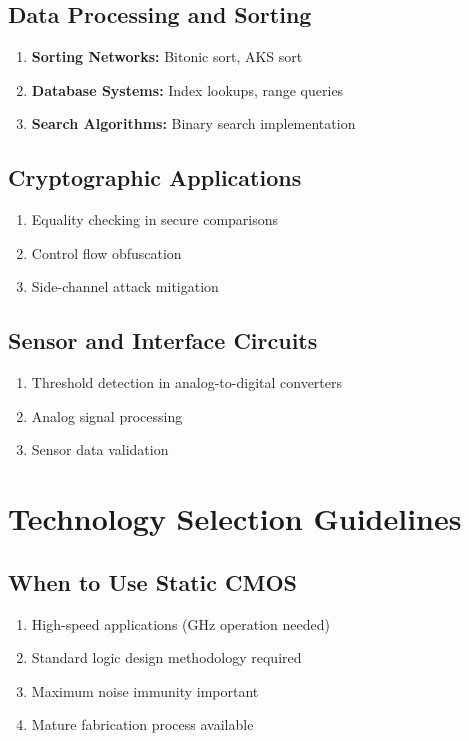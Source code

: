\documentclass[12pt,a4paper,twoside]{report}
\begin{document}
\subsection{Data Processing and Sorting}

\begin{enumerate}
    \item \textbf{Sorting Networks:} Bitonic sort, AKS sort
    \item \textbf{Database Systems:} Index lookups, range queries
    \item \textbf{Search Algorithms:} Binary search implementation
\end{enumerate}

\subsection{Cryptographic Applications}

\begin{enumerate}
    \item Equality checking in secure comparisons
    \item Control flow obfuscation
    \item Side-channel attack mitigation
\end{enumerate}

\subsection{Sensor and Interface Circuits}

\begin{enumerate}
    \item Threshold detection in analog-to-digital converters
    \item Analog signal processing
    \item Sensor data validation
\end{enumerate}

\section{Technology Selection Guidelines}

\subsection{When to Use Static CMOS}

\begin{enumerate}
    \item High-speed applications (GHz operation needed)
    \item Standard logic design methodology required
    \item Maximum noise immunity important
    \item Mature fabrication process available
\end{enumerate}
\end{document}
